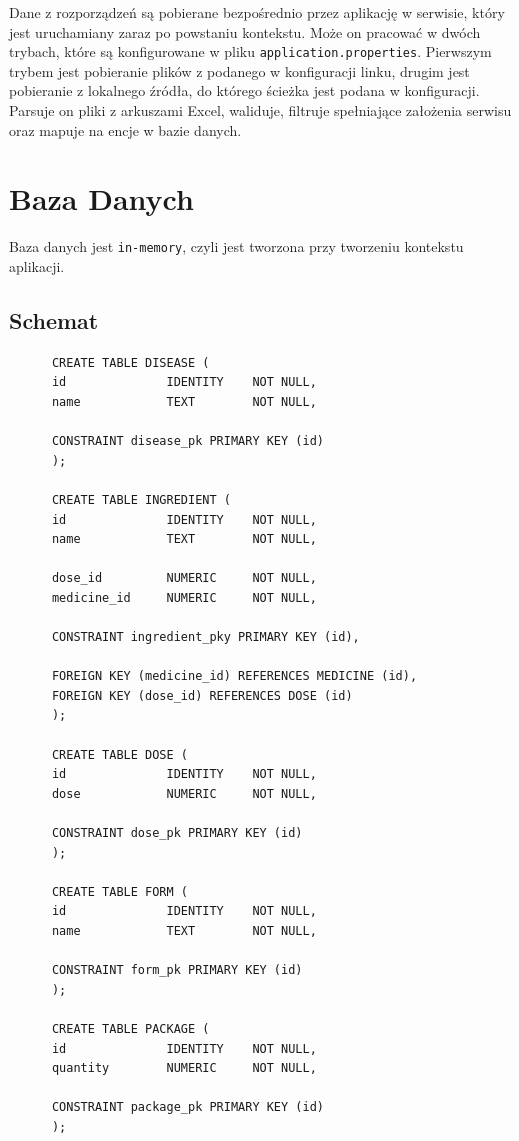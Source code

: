 \documentclass{article}
\begin{document}
  Dane z rozporządzeń są pobierane bezpośrednio przez aplikację w serwisie, który jest uruchamiany zaraz po powstaniu kontekstu.
  Może on pracować w dwóch trybach, które są konfigurowane w pliku \texttt{application.properties}.
  Pierwszym trybem jest pobieranie plików z podanego w konfiguracji linku,
  drugim jest pobieranie z lokalnego źródła, do którego ścieżka jest podana w konfiguracji.
  Parsuje on pliki z arkuszami Excel, waliduje, filtruje spełniające założenia serwisu oraz mapuje na encje w bazie danych.
  \section{Baza Danych}
  Baza danych jest \texttt{in-memory}, czyli jest tworzona przy tworzeniu kontekstu aplikacji.

  \subsection{Schemat}
  \noindent
  \begin{minipage}{.45\textwidth}
    \begin{lstlisting}
      CREATE TABLE DISEASE (
      id              IDENTITY    NOT NULL,
      name            TEXT        NOT NULL,

      CONSTRAINT disease_pk PRIMARY KEY (id)
      );

      CREATE TABLE INGREDIENT (
      id              IDENTITY    NOT NULL,
      name            TEXT        NOT NULL,

      dose_id         NUMERIC     NOT NULL,
      medicine_id     NUMERIC     NOT NULL,

      CONSTRAINT ingredient_pky PRIMARY KEY (id),

      FOREIGN KEY (medicine_id) REFERENCES MEDICINE (id),
      FOREIGN KEY (dose_id) REFERENCES DOSE (id)
      );

      CREATE TABLE DOSE (
      id              IDENTITY    NOT NULL,
      dose            NUMERIC     NOT NULL,

      CONSTRAINT dose_pk PRIMARY KEY (id)
      );

      CREATE TABLE FORM (
      id              IDENTITY    NOT NULL,
      name            TEXT        NOT NULL,

      CONSTRAINT form_pk PRIMARY KEY (id)
      );

      CREATE TABLE PACKAGE (
      id              IDENTITY    NOT NULL,
      quantity        NUMERIC     NOT NULL,

      CONSTRAINT package_pk PRIMARY KEY (id)
      );
    \end{lstlisting}
  \end{minipage}\hfill
\end{document}
